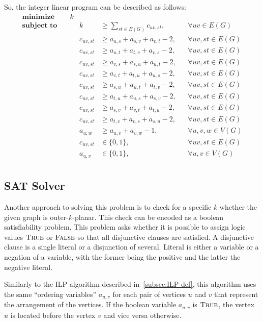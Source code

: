 So, the integer linear program can be described as follows:
\begin{align*}
    \textbf{minimize}\quad&k\\
    \textbf{subject to}\quad&&k &\geqslant \sum_{st \in E(G)} c_{uv, st},&&\forall uv \in E(G)\\
    &&c_{uv, st} &\geqslant a_{u,s} + a_{s,v} + a_{v,t} - 2,&&\forall uv, st \in E(G)\\
    &&c_{uv, st} &\geqslant a_{u,t} + a_{t,v} + a_{v,s} - 2,&&\forall uv, st \in E(G)\\
    &&c_{uv, st} &\geqslant a_{v,s} + a_{s,u} + a_{u,t} - 2,&&\forall uv, st \in E(G)\\
    &&c_{uv, st} &\geqslant a_{v,t} + a_{t,u} + a_{u,s} - 2,&&\forall uv, st \in E(G)\\
    &&c_{uv, st} &\geqslant a_{s,u} + a_{u,t} + a_{t,v} - 2,&&\forall uv, st \in E(G)\\
    &&c_{uv, st} &\geqslant a_{t,u} + a_{u,s} + a_{s,v} - 2,&&\forall uv, st \in E(G)\\
    &&c_{uv, st} &\geqslant a_{s,v} + a_{v,t} + a_{t,u} - 2,&&\forall uv, st \in E(G)\\
    &&c_{uv, st} &\geqslant a_{t,v} + a_{v,s} + a_{s,u} - 2,&&\forall uv, st \in E(G)\\
    &&a_{u, w} &\geqslant a_{u, v} + a_{v, w} - 1,&&\forall u, v, w \in V(G)\\
    &&c_{uv, st} &\in \{0, 1\},&&\forall uv, st \in E(G)\\
    &&a_{u, v} &\in \{0, 1\},&&\forall u, v \in V(G)\\
\end{align*}

\subsection{SAT Solver}

Another approach to solving this problem is to check for a specific $k$ whether the given graph is outer-$k$-planar.
This check can be encoded as a boolean satisfiability problem.
This problem asks whether it is possible to assign logic values $\textsc{True}$ or $\textsc{False}$ so that all disjunctive clauses are satisfied.
A disjunctive clause is a single literal or a disjunction of several.
Literal is either a variable or a negation of a variable, with the former being the positive and the latter the negative literal.


Similarly to the ILP algorithm described in~\ref{subsec:ILP-def}, this algorithm uses the same ``ordering variables'' $a_{u, v}$ for each pair of vertices $u$ and $v$ that represent the arrangement of the vertices.
If the boolean variable $a_{u, v}$ is $\textsc{True}$, the vertex $u$ is located before the vertex $v$ and vice versa otherwise.

